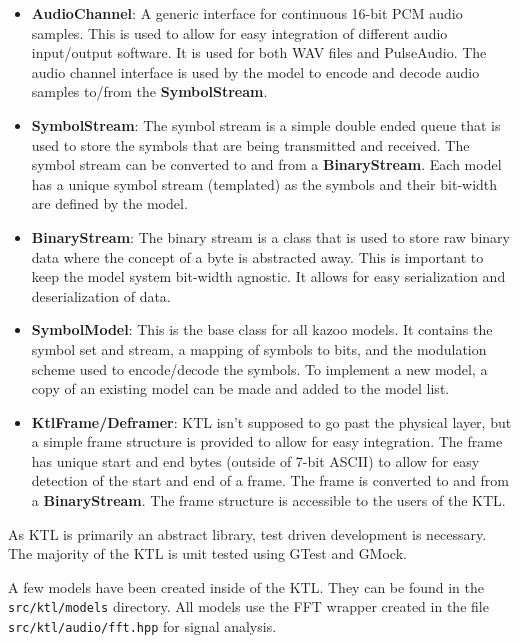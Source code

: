 \documentclass[]{article}
\begin{document}
\begin{itemize}
  \item \textbf{AudioChannel}: A generic interface for continuous 16-bit PCM audio samples. This is used to allow for easy integration of different audio input/output software. It is used for both WAV files and PulseAudio. The audio channel interface is used by the model to encode and decode audio samples to/from the \textbf{SymbolStream}.

  \item \textbf{SymbolStream}: The symbol stream is a simple double ended queue that is used to store the symbols that are being transmitted and received. The symbol stream can be converted to and from a \textbf{BinaryStream}. Each model has a unique symbol stream (templated) as the symbols and their bit-width are defined by the model.

  \item \textbf{BinaryStream}: The binary stream is a class that is used to store raw binary data where the concept of a byte is abstracted away. This is important to keep the model system bit-width agnostic. It allows for easy serialization and deserialization of data.

  \item \textbf{SymbolModel}: This is the base class for all kazoo models. It contains the symbol set and stream, a mapping of symbols to bits, and the modulation scheme used to encode/decode the symbols. To implement a new model, a copy of an existing model can be made and added to the model list.

  \item \textbf{KtlFrame/Deframer}: KTL isn't supposed to go past the physical layer, but a simple frame structure is provided to allow for easy integration. The frame has unique start and end bytes (outside of 7-bit ASCII) to allow for easy detection of the start and end of a frame. The frame is converted to and from a \textbf{BinaryStream}. The frame structure is accessible to the users of the KTL.

\end{itemize}


As KTL is primarily an abstract library, test driven development is necessary. The majority of the KTL is unit tested using GTest and GMock.


A few models have been created inside of the KTL. They can be found in the \texttt{src/ktl/models} directory. All models use the FFT wrapper created in the file \texttt{src/ktl/audio/fft.hpp} for signal analysis.
\end{document}
